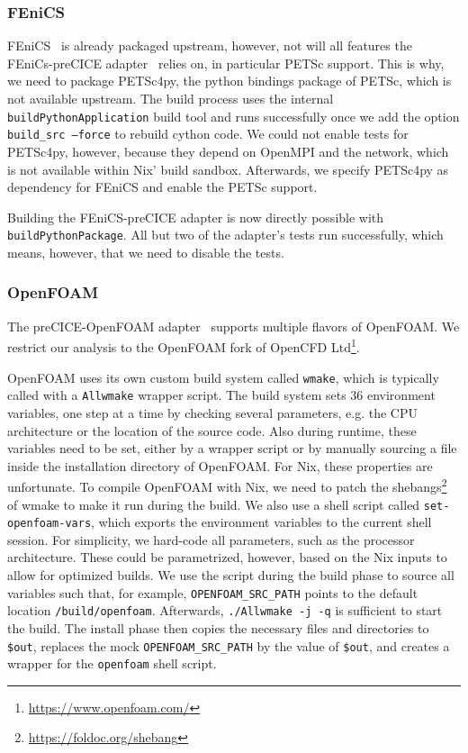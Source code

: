 \documentclass{eceasst}
\begin{document}
\subsubsection{FEniCS}

FEniCS~\cite{fenics} is already packaged upstream, however, not will all features the FEniCs-preCICE adapter~\cite{Rodenberg2021} relies on, in particular PETSc support.
This is why, we need to package PETSc4py, the python bindings package of PETSc, which is not available upstream.
The build process uses the internal \texttt{buildPythonApplication} build tool and runs successfully once we add the option \texttt{build\_src --force} to rebuild cython code.
We could not enable tests for PETSc4py, however, because they depend on OpenMPI and the network, which is not available within Nix' build sandbox.
Afterwards, we specify PETSc4py as dependency for FEniCS and enable the PETSc support.

Building the FEniCS-preCICE adapter is now directly possible with \texttt{buildPythonPackage}.
All but two of the adapter's tests run successfully, which means, however, that we need to disable the tests.

\subsubsection{OpenFOAM}

The preCICE-OpenFOAM adapter~\cite{OpenFOAMpreCICE} supports multiple flavors of OpenFOAM. We restrict our analysis to the OpenFOAM fork of OpenCFD Ltd\footnote{\url{https://www.openfoam.com/}}.

OpenFOAM uses its own custom build system called \texttt{wmake}, which is typically called with a \texttt{Allwmake} wrapper script.
The build system sets 36 environment variables, one step at a time by checking several parameters, e.g. the CPU architecture or the location of the source code. Also during runtime, these variables need to be set, either by a wrapper script or by manually sourcing a file inside the installation directory of OpenFOAM.
For Nix, these properties are unfortunate. To compile OpenFOAM with Nix, we need to patch the shebangs\footnote{\url{https://foldoc.org/shebang}} of wmake to make it run during the build.
We also use a shell script called \texttt{set-openfoam-vars}, which exports the environment variables to the current shell session.
For simplicity, we hard-code all parameters, such as the processor architecture. These could be parametrized, however, based on the Nix inputs to allow for optimized builds. We use the script during the build phase to source all variables such that, for example, \texttt{OPENFOAM\_SRC\_PATH} points to the default location \texttt{/build/openfoam}.
Afterwards, \texttt{./Allwmake -j -q} is sufficient to start the build.
The install phase then copies the necessary files and directories to \texttt{\$out}, replaces the mock \texttt{OPENFOAM\_SRC\_PATH} by the value of \texttt{\$out}, and creates a wrapper for the \texttt{openfoam} shell script.
\end{document}
